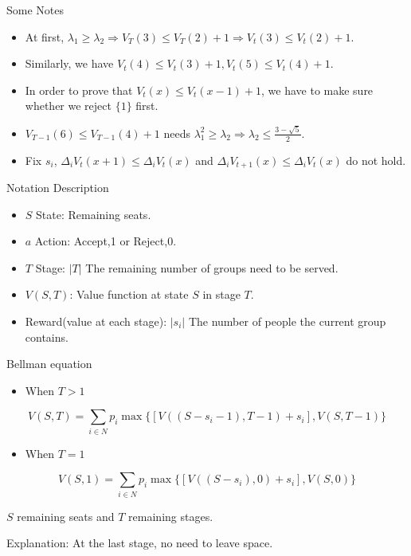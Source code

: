     \begin{frame}{Some Notes}
      \begin{itemize}
        \item At first, $\lambda_1 \geq \lambda_2 \Rightarrow V_T(3) \leq V_T(2) +1 \Rightarrow V_t(3) \leq V_t(2) +1 $.
        \item Similarly, we have $V_t(4) \leq V_t(3) +1, V_t(5) \leq V_t(4) +1$.
        \item In order to prove that $V_t(x) \leq V_t(x-1) +1$, we have to make sure whether we reject $\{1\}$ first.
        \item $V_{T-1}(6) \leq V_{T-1}(4) +1$ needs $\lambda_1^2 \geq \lambda_2 \Rightarrow \lambda_2 \leq \frac{3- \sqrt{5}}{2}.$
        \item Fix $s_i$, $\Delta_i V_t(x+1) \leq \Delta_i V_t(x)$ and $\Delta_i V_{t+1}(x) \leq \Delta_i V_t(x)$ do not hold.
      \end{itemize}
    \end{frame}

    \begin{frame}{Notation Description}
      \begin{itemize}
        \justifying
        \item $S$ State: Remaining seats.
        \vspace{10pt}
        \item $a$ Action: Accept,1 or Reject,0.
        \vspace{10pt}
        \item $T$ Stage: $|T|$ The remaining number of groups need to be served.
        \vspace{10pt}
        \item $V(S,T)$: Value function at state $S$ in stage $T$.
        \vspace{10pt}
        \item Reward(value at each stage): $|s_i|$ The number of people the current group contains.
      \end{itemize}
    \end{frame}


    \begin{frame}{Bellman equation}
      \begin{itemize}
        \item When $T > 1$
      \end{itemize}

      $$V(S,T) = \sum_{i \in N} p_i \max\{ {[V((S-s_i-1),T-1)+ s_i]}, {V(S,T-1)} \}$$

      \begin{itemize}
        \item When $T = 1$
      \end{itemize}

      $$V(S,1) = \sum_{i \in N}p_i \max\{ {[V((S-s_i),0)+ s_i]}, {V(S,0)} \}$$

      \vspace{10pt}
      $S$ remaining seats and $T$ remaining stages.

      Explanation: At the last stage, no need to leave space.
    \end{frame}

